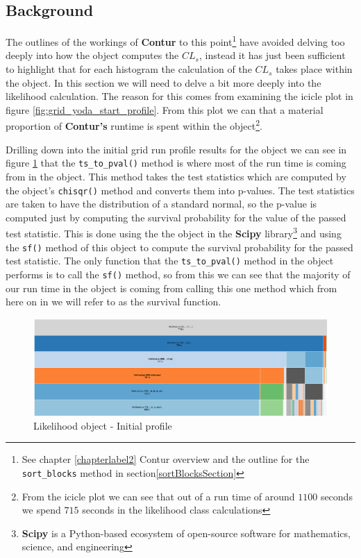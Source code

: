 \subsection{Background}
The outlines of the workings of \textbf{Contur} to this point\footnote{See chapter \ref{chapterlabel2} Contur overview and the outline for the \texttt{sort\_blocks} method in section\ref{sortBlocksSection}} have avoided delving too deeply into how the  object computes the $CL_s$, instead it has just been sufficient to highlight that for each histogram the calculation of the $CL_s$ takes place within the  object. In this section we will need to delve a bit more deeply into the likelihood calculation. The reason for this comes from examining the icicle plot in figure \ref{fig:grid_yoda_start_profile}. From this plot we can that a material proportion of \textbf{Contur's} runtime is spent within the  object\footnote{From the icicle plot we can see that out of a run time of around $1100$ seconds we spend $715$ seconds in the likelihood class calculations}.

Drilling down into the initial grid run profile results for the  object we can see in figure \ref{fig:like_initial_profile} that the \texttt{ts\_to\_pval()} method is where most of the run time is coming from in the  object. This method takes the test statistics which are computed by the  object's \texttt{chisqr()} method and converts them into p-values. The test statistics are taken to have the distribution of a standard normal, so the p-value is computed just by computing the survival probability for the value of the passed test statistic. This is done using the the  object in the \textbf{Scipy} library\footnote{\textbf{Scipy} is a Python-based ecosystem of open-source software for mathematics, science, and engineering\cite{scipy}} and using the \texttt{sf()} method of this object to compute the survival probability for the passed test statistic. The only function that the \texttt{ts\_to\_pval()} method in the  object performs is to call the \texttt{sf()} method, so from this we can see that the majority of our run time in the  object is coming from calling this one method which from here on in we will refer to as the survival function.

\begin{figure}[H]
\centering
\includegraphics[scale=0.23]{plots/likelihood_drill_down.png}
\caption{Likelihood object - Initial profile}
\label{fig:like_initial_profile}
\end{figure}

